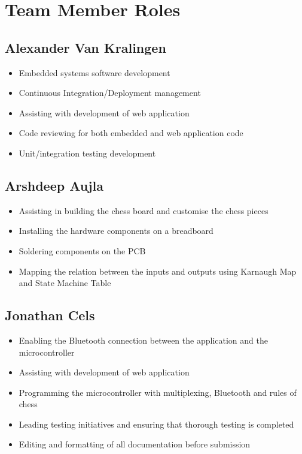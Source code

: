 \documentclass{article}
\begin{document}
\medskip
{}

\section{Team Member Roles}
\subsection{Alexander Van Kralingen}
\begin{itemize}
    \item Embedded systems software development
    \item Continuous Integration/Deployment management
    \item Assisting with development of web application
    \item Code reviewing for both embedded and web application code
    \item Unit/integration testing development
\end{itemize}

\subsection{Arshdeep Aujla}
\begin{itemize}
    \item Assisting in building the chess board and customise the chess pieces
    \item Installing the hardware components on a breadboard
    \item Soldering components on the PCB
    \item Mapping the relation between the inputs and outputs using Karnaugh Map and State Machine Table 
\end{itemize}

\subsection{Jonathan Cels}
\begin{itemize}
    \item Enabling the Bluetooth connection between the application and the microcontroller
    \item Assisting with development of web application
    \item Programming the microcontroller with multiplexing, Bluetooth and rules of chess
    \item Leading testing initiatives and ensuring that thorough testing is completed
    \item Editing and formatting of all documentation before submission
\end{itemize}
\end{document}
